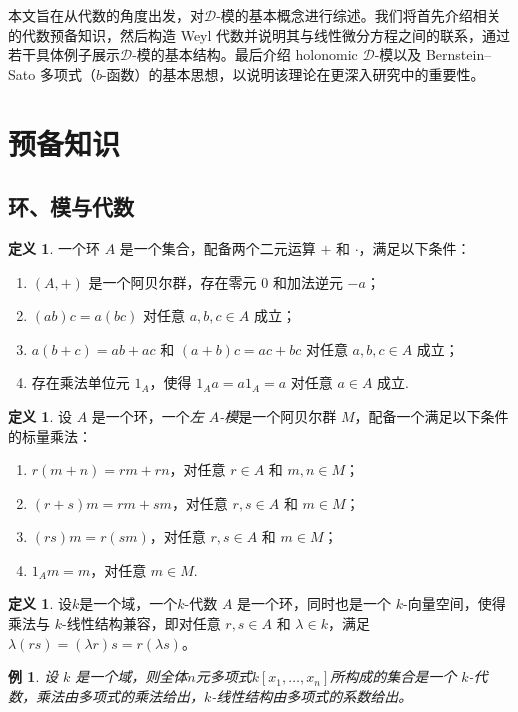 \documentclass[11pt]{article}
\theoremstyle{plain}
\newtheorem{example}[theorem]{例}
\theoremstyle{definition}
\newtheorem{definition}[theorem]{定义}
\theoremstyle{remark}
\begin{document}
本文旨在从代数的角度出发，对$\mathcal{D}$-模的基本概念进行综述。我们将首先介绍相关的代数预备知识，然后构造 Weyl 代数并说明其与线性微分方程之间的联系，通过若干具体例子展示$\mathcal{D}$-模的基本结构。最后介绍 holonomic $\mathcal{D}$-模以及 Bernstein–Sato 多项式（$b$-函数）的基本思想，以说明该理论在更深入研究中的重要性。



\section{预备知识}


\subsection{环、模与代数}
\begin{definition}
    一个环 $A$ 是一个集合，配备两个二元运算 $+$ 和 $\cdot$，满足以下条件：
    \begin{enumerate}[label=(\roman*)]
        \item $(A,+)$ 是一个阿贝尔群，存在零元 $0$ 和加法逆元 $-a$；
        \item  $(ab)c=a(bc)$ 对任意 $a,b,c\in A$ 成立；
        \item  $a(b+c)=ab+ac$ 和 $(a+b)c=ac+bc$ 对任意 $a,b,c\in A$ 成立；
        \item 存在乘法单位元 $1_A$，使得 $1_A a=a 1_A=a$ 对任意 $a\in A$ 成立.
    \end{enumerate}
\end{definition}


\begin{definition}
    设 $A$ 是一个环，一个\emph{左 $A$-模}是一个阿贝尔群 $M$，配备一个满足以下条件的标量乘法：
    \begin{enumerate}[label=(\roman*)]
        \item $r(m+n)=rm+rn$，对任意 $r\in A$ 和 $m,n\in M$；
        \item $(r+s)m=rm+sm$，对任意 $r,s\in A$ 和 $m\in M$；
        \item $(rs)m=r(sm)$，对任意 $r,s\in A$ 和 $m\in M$；
        \item $1_A m=m$，对任意 $m\in M$.
    \end{enumerate}
\end{definition}
\begin{definition}
    设$k$是一个域，一个$k$-代数 $A$ 是一个环，同时也是一个 $k$-向量空间，使得乘法与 $k$-线性结构兼容，即对任意 $r,s\in A$ 和 $\lambda\in k$，满足 $\lambda(rs)=(\lambda r)s=r(\lambda s)$。
\end{definition}
\begin{example}
    设 $k$ 是一个域，则全体$n$元多项式$k[x_1,\ldots,x_n]$所构成的集合是一个 $k$-代数，乘法由多项式的乘法给出，$k$-线性结构由多项式的系数给出。
\end{example}
\end{document}
